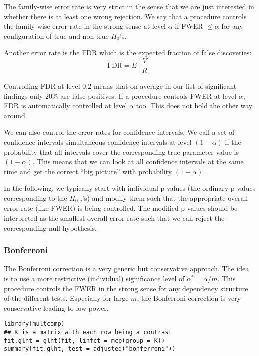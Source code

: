 The family-wise error rate is very strict in the sense that we are just interested in whether there is at least one wrong rejection. We say that a procedure controls the family-wise error rate in the strong sense at level $\alpha$ if FWER $\leq \alpha$ for any configuration of true and non-true $H_0$'s. \medskip

Another error rate is the FDR which is the expected fraction of false discoveries:
$$\text{FDR} = E \left[ \frac{V}{R} \right]$$

Controlling FDR at level $0.2$ means that on average in our list of significant findings only $20\%$ are false positives. If a procedure controls FWER at level $\alpha$, FDR is automatically controlled at level $\alpha$ too. This does not hold the other way around. \medskip

We can also control the error rates for confidence intervals. We call a set of confidence intervals simultaneous confidence intervals at level $(1 - \alpha)$ if the probability that all intervals cover the corresponding true parameter value is $(1 - \alpha)$. This means that we can look at all confidence intervals at the same time and get the correct “big picture” with probability $(1 - \alpha)$. \medskip

In the following, we typically start with individual p-values (the ordinary p-values corresponding to the $H_{0,j}$'s) and modify them such that the appropriate overall error rate (like FWER) is being controlled. The modified p-values should be interpreted as the smallest overall error rate such that we can reject the corresponding null hypothesis.

\subsubsection{Bonferroni}

The Bonferroni correction is a very generic but conservative approach. The idea is to use a more restrictive (individual) significance level of $\alpha^* = \alpha / m$. This procedure controls the FWER in the strong sense for any dependency structure of the different tests. Especially for large $m$, the Bonferroni correction is very conservative leading to low power.

\begin{lstlisting}
library(multcomp)
## K is a matrix with each row being a contrast
fit.glht = glht(fit, linfct = mcp(group = K))
summary(fit.glht, test = adjusted("bonferroni"))
\end{lstlisting}

